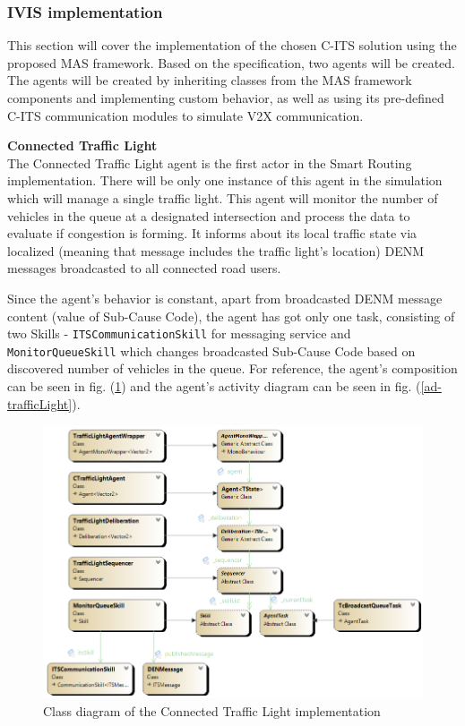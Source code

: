 \documentclass[main.tex]{subfiles}
\begin{document}
\subsubsection{IVIS implementation}

This section will cover the implementation of the chosen C-ITS solution using the proposed 
MAS framework. Based on the specification, two agents will be created. The agents will be 
created by inheriting classes from the MAS framework components and implementing custom behavior, as 
well as using its pre-defined C-ITS communication modules to simulate V2X communication. 

\textbf{Connected Traffic Light} \smallskip \\
The Connected Traffic Light agent is the first actor in the Smart Routing implementation.
There will be only one instance of this agent in the simulation which will manage a 
single traffic light. This agent will monitor the number of vehicles in the queue at a
designated intersection and process the data to evaluate if congestion is forming. It informs
about its local traffic state via localized (meaning that message includes the traffic light's
location) DENM messages broadcasted to all connected road users.

Since the agent's behavior is constant, apart from broadcasted DENM message content (value of
Sub-Cause Code), the agent has got only one task, consisting of two Skills - 
\texttt{ITSCommunicationSkill} for messaging service and \texttt{MonitorQueueSkill} which 
changes broadcasted Sub-Cause Code based on discovered number of vehicles in the queue. 
For reference, the agent's composition can be seen in fig. (\ref{cd-trafficLight}) and 
the agent's activity diagram can be seen in fig. (\ref{ad-trafficLight}).


\begin{figure}[htbp]
    \centering
    \includegraphics[width=.9\textwidth]{cd-SmartTrafficLight.png}
    \caption{Class diagram of the Connected Traffic Light implementation}
    \label{cd-trafficLight}
\end{figure}
\end{document}
